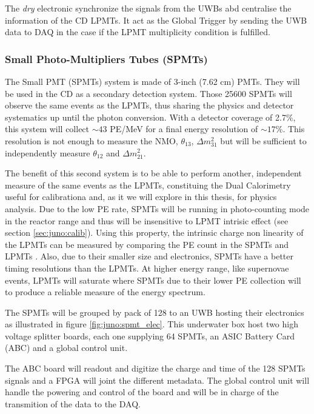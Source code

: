 \documentclass[../main.tex]{subfiles}
\begin{document}
The \textit{dry} electronic synchronize the signals from the UWBs abd centralise the information of the CD LPMTs. It act as the Global Trigger by sending the UWB data to DAQ in the case if the LPMT multiplicity condition is fulfilled.


\subsubsection{Small Photo-Multipliers Tubes (SPMTs)}
\label{sec:juno:SPMT}

The Small PMT (SPMTs) system is made of 3-inch (7.62 cm) PMTs. They will be used in the CD as a secondary detection system. Those 25600 SPMTs will observe the same events as the LPMTs, thus sharing the physics and detector systematics up until the photon conversion. With a detector coverage of 2.7\%, this system will collect $\sim 43$ PE/MeV for a final energy resolution of $\sim 17\%$. This resolution is not enough to measure the NMO, $\theta_{13}$, $\Delta m^2_{31}$ but will be sufficient to independently measure $\theta_{12}$ and $\Delta m^2_{21}$.

The benefit of this second system is to be able to perform another, independent measure of the same events as the LPMTs, constituing the Dual Calorimetry useful for calibrationa and, as it we will explore in this thesis, for physics analysis.
Due to the low PE rate, SPMTs will be running in photo-counting mode in the reactor range and thus will be insensitive to LPMT intrisic effect (see section \ref{sec:juno:calib}). Using this property, the intrinsic charge non linearity of the LPMTs can be measured by comparing the PE count in the SPMTs and LPMTs \cite{han_dual_2021}. Also, due to their smaller size and electronics, SPMTs have a better timing resolutions than the LPMTs.
At higher energy range, like supernovae events, LPMTs will saturate where SPMTs due to their lower PE collection will to produce a reliable measure of the energy spectrum.

The SPMTs will be grouped by pack of 128 to an UWB hosting their electronics as illustrated in figure \ref{fig:juno:spmt_elec}. This underwater box host two high voltage splitter boards, each one supplying 64 SPMTs, an ASIC Battery Card (ABC) and a global control unit.

The ABC board will readout and digitize the charge and time of the 128 SPMTs signals and a FPGA will joint the different metadata. The global control unit will handle the powering and control of the board and will be in charge of the transmition of the data to the DAQ.
\end{document}
